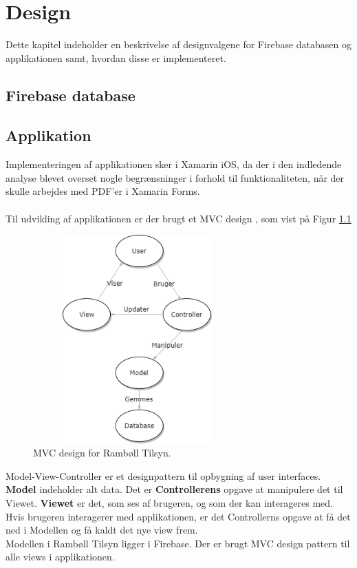 \chapter{Design}
Dette kapitel indeholder en beskrivelse af designvalgene for Firebase databasen og applikationen samt, hvordan disse er implementeret. \\

\section{Firebase database} \label{sec:FirebaseDesign}

\section{Applikation} \label{sec:ApplikationDesign}
Implementeringen af applikationen sker i Xamarin iOS, da der i den indledende analyse blevet overset nogle begrænsninger i forhold til funktionaliteten, når der skulle arbejdes med PDF'er i Xamarin Forms\cite{Forms}. \\ \\
Til udvikling af applikationen er der brugt et MVC design \cite{MVC}, som vist på Figur \ref{fig:MVC}
\begin{figure}[H] %
	\centering
	\includegraphics[height=8cm, width=8cm]{../ArkitekturDesign/Design/MVC}
	\caption{MVC design for Rambøll Tilsyn.}
	\label{fig:MVC}
\end{figure}

Model-View-Controller er et designpattern til opbygning af user interfaces. \textbf{Model} indeholder alt data. Det er \textbf{Controllerens} opgave at manipulere det til Viewet. \textbf{Viewet} er det, som
ses af brugeren, og som der kan interageres med. Hvis brugeren interagerer med applikationen, er
det Controllerns opgave at få det ned i Modellen og få kaldt det nye view frem. \\
Modellen i Rambøll Tilsyn ligger i Firebase.
Der er brugt MVC design pattern til alle views i applikationen.

\clearpage







